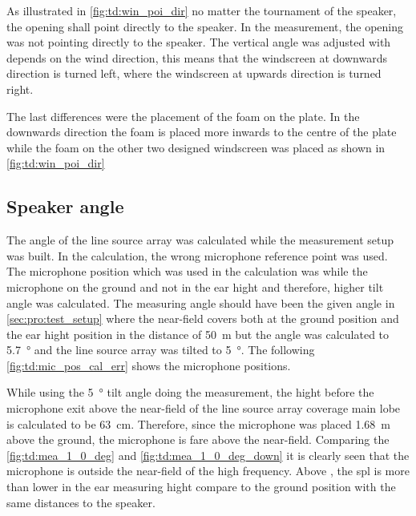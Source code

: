 
As illustrated in \autoref{fig:td:win_poi_dir} no matter the tournament of the speaker, the opening shall point directly to the speaker. In the measurement, the opening was not pointing directly to the speaker. The vertical angle was adjusted with depends on the wind direction, this means that the windscreen at downwards direction is turned left, where the windscreen at upwards direction is turned right. 

The last differences were the placement of the foam on the plate. In the downwards direction the foam is placed more inwards to the centre of the plate while the foam on the other two designed windscreen was placed as shown in \autoref{fig:td:win_poi_dir}


\subsection{Speaker angle}\label{sec:des:measuring_angle}
The angle of the line source array was calculated while the measurement setup was built. In the calculation, the wrong microphone reference point was used. The microphone position which was used in the calculation was while the microphone on the ground and not in the ear hight and therefore, higher tilt angle was calculated.  The measuring angle should have been the given angle in \autoref{sec:pro:test_setup} where the near-field covers both at the ground position and the ear hight position in the distance of \SI{50}{\meter} but the angle was calculated to \SI{5.7}{\degree} and the line source array was tilted to \SI{5}{\degree}. The following \autoref{fig:td:mic_pos_cal_err} shows the microphone positions.



While using the \SI{5}{\degree} tilt angle doing the measurement, the hight before the microphone exit above the near-field of the line source array coverage main lobe is calculated to be \SI{63}{\centi\meter}. Therefore, since the microphone was placed \SI{1.68}{\meter} above the ground, the microphone is fare above the near-field. Comparing the \autoref{fig:td:mea_1_0_deg} and \autoref{fig:td:mea_1_0_deg_down} it is clearly seen that the microphone is outside the near-field of the high frequency. Above , the \gls{spl} is more than  lower in the ear measuring hight compare to the ground position with the same distances to the speaker. 

